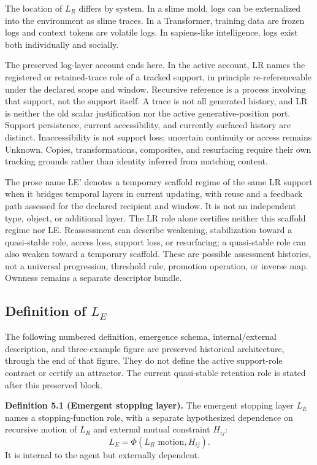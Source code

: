 The location of $L_R$ differs by system. In a slime mold, logs can be externalized into the environment as slime traces. In a Transformer, training data are frozen logs and context tokens are volatile logs. In sapiens-like intelligence, logs exist both individually and socially.

The preserved log-layer account ends here. In the active account, LR names the registered or retained-trace role of a tracked support, in principle re-referenceable under the declared scope and window. Recursive reference is a process involving that support, not the support itself. A trace is not all generated history, and LR is neither the old scalar justification nor the active generative-position port. Support persistence, current accessibility, and currently surfaced history are distinct. Inaccessibility is not support loss; uncertain continuity or access remains Unknown. Copies, transformations, composites, and resurfacing require their own tracking grounds rather than identity inferred from matching content.

The prose name LE' denotes a temporary scaffold regime of the same LR support when it bridges temporal layers in current updating, with reuse and a feedback path assessed for the declared recipient and window. It is not an independent type, object, or additional layer. The LR role alone certifies neither this scaffold regime nor LE. Reassessment can describe weakening, stabilization toward a quasi-stable role, access loss, support loss, or resurfacing; a quasi-stable role can also weaken toward a temporary scaffold. These are possible assessment histories, not a universal progression, threshold rule, promotion operation, or inverse map. Ownness remains a separate descriptor bundle.

\subsection{Definition of $L_E$}

The following numbered definition, emergence schema, internal/external description, and three-example figure are preserved historical architecture, through the end of that figure. They do not define the active support-role contract or certify an attractor. The current quasi-stable retention role is stated after this preserved block.

\textbf{Definition 5.1 (Emergent stopping layer).}
The emergent stopping layer $L_E$ names a stopping-function role, with a separate hypothesized dependence on recursive motion of $L_R$ and external mutual constraint $H_{ij}$:
\[
L_E=\Phi(L_R\text{ motion},H_{ij}).
\]
It is internal to the agent but externally dependent.

